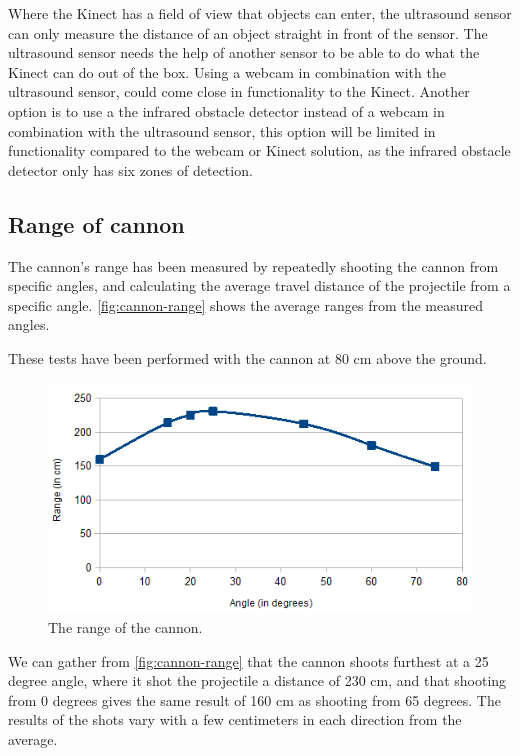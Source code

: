 Where the Kinect has a field of view that objects can enter, the ultrasound sensor can only measure the distance of an object straight in front of the sensor. The ultrasound sensor needs the help of another sensor to be able to do what the Kinect can do out of the box. Using a webcam in combination with the ultrasound sensor, could come close in functionality to the Kinect. Another option is to use a the infrared obstacle detector instead of a webcam in combination with the ultrasound sensor, this option will be limited in functionality compared to the webcam or Kinect solution, as the infrared obstacle detector only has six zones of detection.

\subsection{Range of cannon}
\label{cannonrange}
The cannon's range has been measured by repeatedly shooting the cannon from specific angles, and calculating the average travel distance of the projectile from a specific angle. \autoref{fig:cannon-range} shows the average ranges from the measured angles.

These tests have been performed with the cannon at 80 cm above the ground.

\begin{figure}[hbtp]
\includegraphics[width=\textwidth]{img/cannon-range.png}
\caption{The range of the cannon.} 
\label{fig:cannon-range} 
\end{figure}

We can gather from \autoref{fig:cannon-range} that the cannon shoots furthest at a 25 degree angle, where it shot the projectile a distance of 230 cm, and that shooting from 0 degrees gives the same result of 160 cm as shooting from 65 degrees. The results of the shots vary with a few centimeters in each direction from the average.

